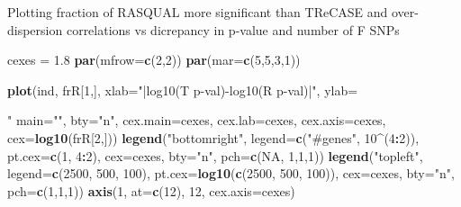 \documentclass[]{article}
\newenvironment{Shaded}{\begin{snugshade}}{\end{snugshade}}
\newcommand{\KeywordTok}[1]{\textcolor[rgb]{0.13,0.29,0.53}{\textbf{#1}}}
\newcommand{\DataTypeTok}[1]{\textcolor[rgb]{0.13,0.29,0.53}{#1}}
\newcommand{\DecValTok}[1]{\textcolor[rgb]{0.00,0.00,0.81}{#1}}
\newcommand{\FloatTok}[1]{\textcolor[rgb]{0.00,0.00,0.81}{#1}}
\newcommand{\StringTok}[1]{\textcolor[rgb]{0.31,0.60,0.02}{#1}}
\newcommand{\OtherTok}[1]{\textcolor[rgb]{0.56,0.35,0.01}{#1}}
\newcommand{\OperatorTok}[1]{\textcolor[rgb]{0.81,0.36,0.00}{\textbf{#1}}}
\newcommand{\NormalTok}[1]{#1}
\begin{document}
Plotting fraction of RASQUAL more significant than TReCASE and
over-dispersion correlations vs dicrepancy in p-value and number of F
SNPs

\begin{Shaded}
\begin{Highlighting}[]
\NormalTok{cexes =}\StringTok{ }\FloatTok{1.8}
\KeywordTok{par}\NormalTok{(}\DataTypeTok{mfrow=}\KeywordTok{c}\NormalTok{(}\DecValTok{2}\NormalTok{,}\DecValTok{2}\NormalTok{))}
\KeywordTok{par}\NormalTok{(}\DataTypeTok{mar=}\KeywordTok{c}\NormalTok{(}\DecValTok{5}\NormalTok{,}\DecValTok{5}\NormalTok{,}\DecValTok{3}\NormalTok{,}\DecValTok{1}\NormalTok{))}

\KeywordTok{plot}\NormalTok{(ind, frR[}\DecValTok{1}\NormalTok{,], }\DataTypeTok{xlab=}\StringTok{"|log10(T p-val)-log10(R p-val)|"}\NormalTok{, }\DataTypeTok{ylab=}\StringTok{"%p(R)<p(T)"}\NormalTok{, }
\DataTypeTok{main=}\StringTok{""}\NormalTok{, }\DataTypeTok{bty=}\StringTok{"n"}\NormalTok{, }\DataTypeTok{cex.main=}\NormalTok{cexes, }\DataTypeTok{cex.lab=}\NormalTok{cexes, }\DataTypeTok{cex.axis=}\NormalTok{cexes, }\DataTypeTok{cex=}\KeywordTok{log10}\NormalTok{(frR[}\DecValTok{2}\NormalTok{,]))}
\KeywordTok{legend}\NormalTok{(}\StringTok{"bottomright"}\NormalTok{, }\DataTypeTok{legend=}\KeywordTok{c}\NormalTok{(}\StringTok{"#genes"}\NormalTok{, }\DecValTok{10}\OperatorTok{^}\NormalTok{(}\DecValTok{4}\OperatorTok{:}\DecValTok{2}\NormalTok{)), }\DataTypeTok{pt.cex=}\KeywordTok{c}\NormalTok{(}\DecValTok{1}\NormalTok{, }\DecValTok{4}\OperatorTok{:}\DecValTok{2}\NormalTok{), }
       \DataTypeTok{cex=}\NormalTok{cexes, }\DataTypeTok{bty=}\StringTok{"n"}\NormalTok{, }\DataTypeTok{pch=}\KeywordTok{c}\NormalTok{(}\OtherTok{NA}\NormalTok{, }\DecValTok{1}\NormalTok{,}\DecValTok{1}\NormalTok{,}\DecValTok{1}\NormalTok{))}
\KeywordTok{legend}\NormalTok{(}\StringTok{"topleft"}\NormalTok{, }\DataTypeTok{legend=}\KeywordTok{c}\NormalTok{(}\DecValTok{2500}\NormalTok{, }\DecValTok{500}\NormalTok{, }\DecValTok{100}\NormalTok{), }\DataTypeTok{pt.cex=}\KeywordTok{log10}\NormalTok{(}\KeywordTok{c}\NormalTok{(}\DecValTok{2500}\NormalTok{, }\DecValTok{500}\NormalTok{, }\DecValTok{100}\NormalTok{)), }
       \DataTypeTok{cex=}\NormalTok{cexes, }\DataTypeTok{bty=}\StringTok{"n"}\NormalTok{, }\DataTypeTok{pch=}\KeywordTok{c}\NormalTok{(}\DecValTok{1}\NormalTok{,}\DecValTok{1}\NormalTok{,}\DecValTok{1}\NormalTok{))}
\KeywordTok{axis}\NormalTok{(}\DecValTok{1}\NormalTok{, }\DataTypeTok{at=}\KeywordTok{c}\NormalTok{(}\DecValTok{12}\NormalTok{), }\DecValTok{12}\NormalTok{, }\DataTypeTok{cex.axis=}\NormalTok{cexes)}

}
\end{Highlighting}
\end{Shaded}
\end{document}
